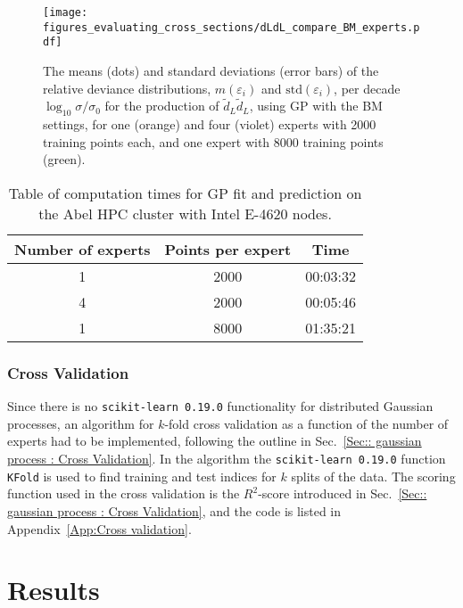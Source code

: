 \documentclass[twoside,english]{uiofysmaster}
\begin{document}
{{\begin{figure}
\centering
\texttt{[image: figures\_evaluating\_cross\_sections/dLdL\_compare\_BM\_experts.pdf]}
\caption[The relative deviance distributions for DGP]{The means (dots) and standard deviations (error bars) of the relative deviance distributions, $m(\varepsilon_i)$ and $\mathrm{std}(\varepsilon_i)$, per decade $\log_{10} \sigma / \sigma_0$ for the production of $\widetilde{d}_L \widetilde{d}_L$, using GP with the BM settings, for one (orange) and four (violet) experts with 2000 training points each, and one expert with 8000 training points (green).}
\label{Fig:: evaluating cross : compare 1 vs 4 expert dLdL}
\end{figure}  

\begin{table}
\centering
\begin{tabular}{@{}ccc@{}} \toprule
Number of experts & Points per expert & Time\\
\midrule
1 & 2000 & 00:03:32\\
4 & 2000 & 00:05:46\\
1 & 8000 & 01:35:21\\ \bottomrule
\end{tabular}
\caption{Table of computation times for GP fit and prediction on the Abel HPC cluster with Intel E-4620 nodes.}
\label{Tab:: evaluating cross : computation times experts BM}
\end{table}


\subsection{Cross Validation}

Since there is no \verb|scikit-learn 0.19.0| functionality for distributed Gaussian processes, an algorithm for $k$-fold cross validation as a function of the number of experts had to be implemented, following the outline in Sec.~\ref{Sec:: gaussian process : Cross Validation}. In the algorithm the \verb|scikit-learn 0.19.0| function \verb|KFold| is used to find training and test indices for $k$ splits of the data. The scoring function used in the cross validation is the $R^2$-score introduced in Sec.~\ref{Sec:: gaussian process : Cross Validation}, and the code is listed in Appendix~\ref{App:Cross validation}. 


\chapter{Results}\label{Chapter:Results}

}}
\end{document}
